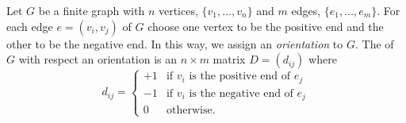 \documentclass[12pt]{article}
\begin{document}
Let $G$ be a finite graph with $n$ vertices, $\{v_1, \ldots, v_n\}$
and $m$ edges, $\{e_1, \ldots, e_m\}$. 
For each edge $e = (v_i,v_j)$ of $G$ choose one vertex
to be the positive end and the other to be the negative end. In this way,
we assign an \emph{orientation} to $G$. The \emph{}
of $G$ with respect an orientation is an $n \times m$ matrix 
$D=(d_{ij})$
where
\begin{displaymath}
d_{ij} = \left\{ \begin{array}{ll}
+1 & \textrm{if $v_i$ is the positive end of $e_j$} \\
-1 & \textrm{if $v_i$ is the negative end of $e_j$} \\
0 & \textrm{otherwise}.
\end{array} \right.
\end{displaymath}

\end{document}
